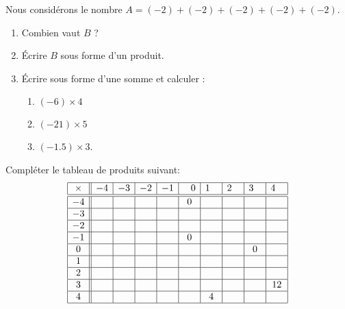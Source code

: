 
Nous considérons le nombre \( A=(-2)+(-2)+(-2)+(-2)+(-2)\).

\begin{enumerate}
    \item
        Combien vaut \( B\) ?
    \item
        Écrire \( B\) sous forme d'un produit.
    \item
        Écrire sous forme d'une somme et calculer :
        \begin{enumerate}
            \item \( (-6)\times 4\)
            \item \( (-21)\times 5\)
            \item\( (-1.5)\times 3\).
        \end{enumerate}
\end{enumerate}

Compléter le tableau de produits suivant:
\begin{equation*}
    \begin{array}[]{|c||c|c|c|c|c|c|c|c|c|}
        \hline
        \times&-4&-3&-2&-1&\hphantom{-}0&1\hphantom{-}&2\hphantom{-}&3\hphantom{-}&4\hphantom{-}\\
        \hline\hline
        -4&&&&&0&&&&\\
        \hline
        -3&&&&&&&&&\\
        \hline
        -2&&&&&&&&&\\
        \hline
        -1&&&&&0&&&&\\
        \hline
        0&&&&&&&&0&\\
        \hline
        1&&&&&&&&&\\
        \hline
        2&&&&&&&&&\\
        \hline
        3&&&&&&&&&12\\
        \hline
        4&&&&&&4&&&\\
        \hline
    \end{array}
\end{equation*}
